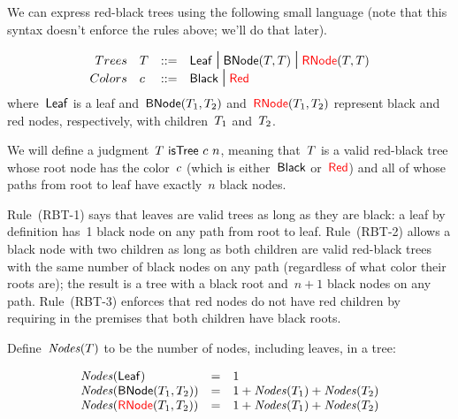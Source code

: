 \documentclass{article}
\begin{document}
We can express red-black trees using the following small language
(note that this syntax doesn't enforce the rules above; we'll do that later).

\[
\begin{array}{r l l l}
  Trees & T & \mathop{::=} & \mathsf{Leaf} \mbox{\Large $\,\mid\,$} \mathsf{BNode}(T, T) \mbox{\Large $\,\mid\,$}
  {\color{red}{\mathsf{RNode}}}(T, T)\\
  Colors & c & \mathop{::=} & \mathsf{Black} \mbox{\Large $\,\mid\,$} {\color{red}{\mathsf{Red}}}\\
\end{array}
\]
where~$\mathsf{Leaf}$ is a leaf and~$\mathsf{BNode}(T_1, T_2)$
and~${\color{red}{\mathsf{RNode}}}(T_1, T_2)$ represent black and red nodes, respectively,
with children~$T_1$ and~$T_2$.

We will define a judgment~$T~\mathsf{isTree}~c~n$, meaning that~$T$ is
a valid red-black tree whose root node has the color~$c$ (which is
either~$\mathsf{Black}$ or~${\color{red}{\mathsf{Red}}}$) and all of whose paths from root to leaf have
exactly~$n$ black nodes.

{
  \centering
  \def \MathparLineskip {\lineskip=0.43cm}
}

Rule~(RBT-1) says that leaves are valid trees as long as they are
black: a leaf by definition has~1 black node on any path from root to leaf.
%
Rule~(RBT-2) allows a black node with two children as long as both
children are valid red-black trees with the same number of black nodes on any
path (regardless of what color their roots are); the result is a tree with a
black root and~$n+1$ black nodes on any path.
%
Rule~(RBT-3) enforces that red nodes do not have red children by
requiring in the premises that both children have black roots.

Define~$\mathit{Nodes}(T)$ to be the number of nodes, including leaves, in a
tree:

\[
\begin{array}{l l l}
  \mathit{Nodes}(\mathsf{Leaf}) & = & 1\\
  \mathit{Nodes}(\mathsf{BNode}(T_1, T_2)) & = & 1 + \mathit{Nodes}(T_1) + \mathit{Nodes}(T_2)\\
  \mathit{Nodes}({\color{red}{\mathsf{RNode}}}(T_1, T_2)) & = & 1 + \mathit{Nodes}(T_1) + \mathit{Nodes}(T_2)
\end{array}
\]
\end{document}

